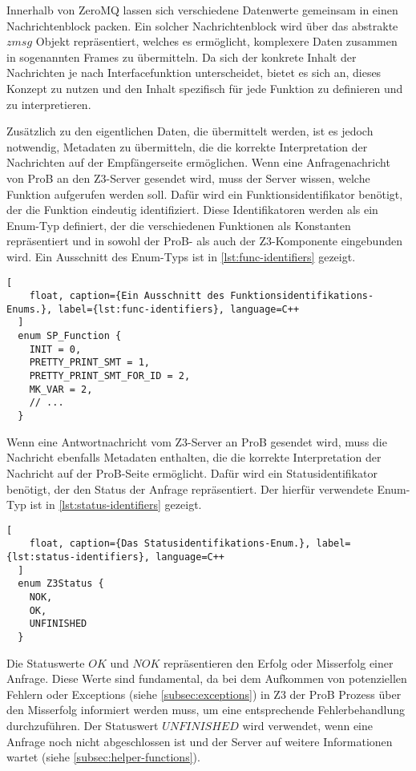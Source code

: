 Innerhalb von ZeroMQ lassen sich verschiedene Datenwerte gemeinsam in einen Nachrichtenblock packen.
Ein solcher Nachrichtenblock wird über das abstrakte $zmsg$ Objekt repräsentiert, welches es ermöglicht,
komplexere Daten zusammen in sogenannten Frames zu übermitteln.
Da sich der konkrete Inhalt der Nachrichten je nach Interfacefunktion unterscheidet,
bietet es sich an, dieses Konzept zu nutzen und den Inhalt spezifisch für jede Funktion zu definieren und zu interpretieren.

Zusätzlich zu den eigentlichen Daten, die übermittelt werden, ist es jedoch notwendig, Metadaten zu übermitteln,
die die korrekte Interpretation der Nachrichten auf der Empfängerseite ermöglichen.
Wenn eine Anfragenachricht von ProB an den Z3-Server gesendet wird, muss der Server wissen, welche Funktion aufgerufen werden soll.
Dafür wird ein Funktionsidentifikator benötigt, der die Funktion eindeutig identifiziert.
Diese Identifikatoren werden als ein Enum-Typ definiert, der die verschiedenen Funktionen als Konstanten repräsentiert und in sowohl
der ProB- als auch der Z3-Komponente eingebunden wird.
Ein Ausschnitt des Enum-Typs ist in \cref{lst:func-identifiers} gezeigt.

\begin{lstlisting}[
    float, caption={Ein Ausschnitt des Funktionsidentifikations-Enums.}, label={lst:func-identifiers}, language=C++
  ]
  enum SP_Function {
    INIT = 0,
    PRETTY_PRINT_SMT = 1,
    PRETTY_PRINT_SMT_FOR_ID = 2,
    MK_VAR = 2,
    // ...
  }
\end{lstlisting}

Wenn eine Antwortnachricht vom Z3-Server an ProB gesendet wird, muss die Nachricht ebenfalls Metadaten enthalten,
die die korrekte Interpretation der Nachricht auf der ProB-Seite ermöglicht.
Dafür wird ein Statusidentifikator benötigt, der den Status der Anfrage repräsentiert.
Der hierfür verwendete Enum-Typ ist in \cref{lst:status-identifiers} gezeigt.

\begin{lstlisting}[
    float, caption={Das Statusidentifikations-Enum.}, label={lst:status-identifiers}, language=C++
  ]
  enum Z3Status {
    NOK,
    OK,
    UNFINISHED
  }
\end{lstlisting}

Die Statuswerte $OK$ und $NOK$ repräsentieren den Erfolg oder Misserfolg einer Anfrage.
Diese Werte sind fundamental, da bei dem Aufkommen von potenziellen Fehlern oder Exceptions (siehe \cref{subsec:exceptions}) in Z3 der ProB Prozess über den Misserfolg informiert werden muss,
um eine entsprechende Fehlerbehandlung durchzuführen. 
Der Statuswert $UNFINISHED$ wird verwendet, wenn eine Anfrage noch nicht abgeschlossen ist und der Server auf weitere Informationen wartet (siehe \cref{subsec:helper-functions}).

